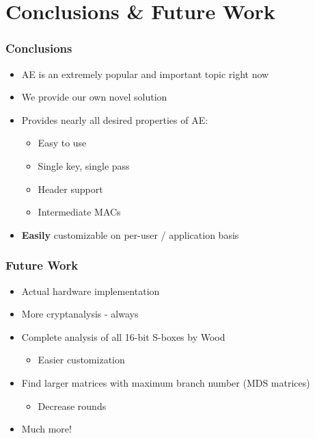\section{Conclusions \& Future Work}
\begin{frame}
\frametitle{Conclusions}
\begin{itemize}
  \item AE is an extremely popular and important topic right now
  \item We provide our own novel solution
  \item Provides nearly all desired properties of AE:
  \begin{itemize}
    \item Easy to use
    \item Single key, single pass
    \item Header support
    \item Intermediate MACs
  \end{itemize}
  \item \textbf{Easily} customizable on per-user / application basis
\end{itemize}
\end{frame}

\begin{frame}
\frametitle{Future Work}
\begin{itemize}
  \item Actual hardware implementation
  \item More cryptanalysis - always
  \item Complete analysis of all 16-bit S-boxes by Wood
  \begin{itemize}
    \item Easier customization
  \end{itemize}
  \item Find larger matrices with maximum branch number (MDS matrices)
  \begin{itemize}
    \item Decrease rounds
  \end{itemize}
  \item Much more!
\end{itemize} 
\end{frame}

